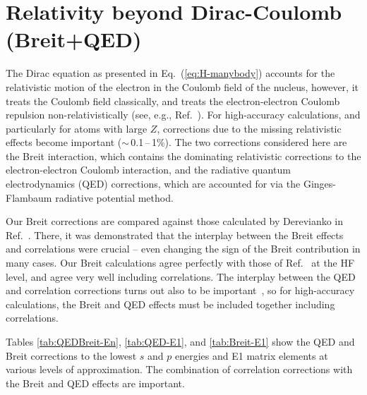 \documentclass[10pt,twocolumn,a4paper]{article}%
\begin{document}
\section{Relativity beyond Dirac-Coulomb (Breit+QED)}


The Dirac equation as presented in Eq.~(\ref{eq:H-manybody})
accounts for the relativistic motion of the electron in the Coulomb field of the nucleus, however, it treats the Coulomb field classically, and treats the electron-electron Coulomb repulsion non-relativistically (see, e.g., Ref.~\cite{BetheBook}).
For high-accuracy calculations, and particularly for atoms with large $Z$, corrections due to the missing relativistic effects become important ($\sim$\,0.1\,--\,1\%).
The two corrections considered here are the
Breit interaction, which contains the dominating relativistic corrections to the electron-electron Coulomb interaction, and 
the radiative quantum electrodynamics (QED) corrections, which are accounted for via the Ginges-Flambaum radiative potential method.

Our Breit corrections are compared against those calculated by Derevianko in Ref.~\cite{Derevianko2001}.
There, it was demonstrated that the interplay between the Breit effects and correlations were crucial -- even changing the sign of the Breit contribution in many cases.
Our Breit calculations agree perfectly with those of Ref.~\cite{Derevianko2001} at the HF level, and agree very well including correlations.
%
The interplay between the QED and correlation corrections turns out also to be important~\cite{GingesQED2015,Ginges2016}, so for high-accuracy calculations, the Breit and QED effects must be included together including correlations.


Tables \ref{tab:QEDBreit-En}, \ref{tab:QED-E1}, and \ref{tab:Breit-E1} show the QED and Breit corrections to the lowest $s$ and $p$ energies and E1 matrix elements at various levels of approximation.
The combination of correlation corrections with the Breit and QED effects are important.
\end{document}

